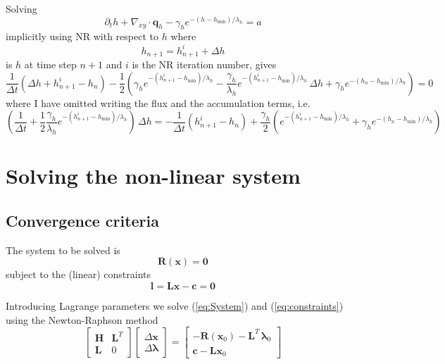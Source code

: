 \documentclass[10pt,a4paper]{book}
\newcommand{\p}{\partial}
\begin{document}
Solving
\[
\p_t h + \nabla_{xy} \cdot \bm{q}_h  -\gamma_h e^{-(h-h_{\mathrm{min}})/\lambda_h} = a
\]
implicitly using NR with respect to $h$ where
\[
h_{n+1}=h_{n+1}^i+\Delta h
\]
is $h$ at time step $n+1$ and $i$ is the NR iteration number, gives
\[ 
\frac{1}{\Delta t} ( \Delta h + h^i_{n+1} - h_n)
-\frac{1}{2} \left (\gamma_h e^{-(h_{n+1}^i -h_{\mathrm{min}})/\lambda_h} 
-\frac{\gamma_h}{\lambda_h} e^{-(h_{n+1}^i -h_{\mathrm{min}})/\lambda_h}\,\Delta h 
+  \gamma_h e^{-(h_n-h_{\mathrm{min}})/\lambda_h} \right )=0
\]
where I have omitted writing the flux and the accumulation terms, i.e.\
\[
\left ( \frac{1}{\Delta t} + \frac{1}{2} \frac{\gamma_h}{\lambda_h} e^{-(h_{n+1}^i -h_{\mathrm{min}})/\lambda_h} \right ) \,\Delta h 
=-\frac{1}{\Delta t} (h^i_{n+1} - h_n)
+\frac{\gamma_h}{2} \left ( e^{-(h_{n+1}^i -h_{\mathrm{min}})/\lambda_h} 
+  \gamma_h e^{-(h_n-h_{\mathrm{min}})/\lambda_h} \right )
\]



\chapter{Solving the non-linear system}

\section{Convergence criteria}
The system to be solved is
\begin{equation}
 \bm{R}(\bm{x})= \bm{0}
\label{eq:System2}
\end{equation}
subject to the (linear) constraints
\begin{equation}
\bm{l}=\bm{L} \bm{x} -\bm{c} = \bm{0}
\label{eq:constraints}
\end{equation}

Introducing Lagrange parameters we solve (\ref{eq:System}) and
(\ref{eq:constraints}) using the Newton-Raphson method
\begin{equation}
\left [ \begin{array}{cc}
\bm{H}    & \bm{L}^T  \\
 \bm{L} & 0 
\end{array} \right ]
\left [ \begin{array}{c}
\Delta \bm{x} \\
\Delta \bm{\lambda}
\end{array} \right ]
=\left [ \begin{array}{c}
-\bm{R}(\bm{x}_0) -  \bm{L}^T \, \bm{\lambda}_0 \\
\bm{c} -\bm{L} \bm{x}_0
\end{array} \right ]
\label{eq:KLL}
\end{equation}
\end{document}
